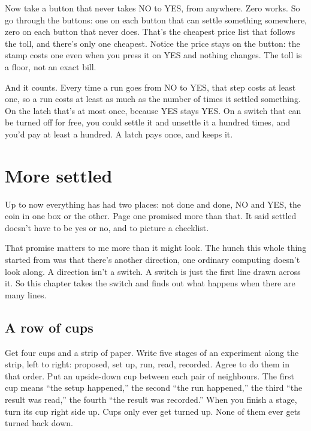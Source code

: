 \documentclass[11pt,twoside]{article}
\theoremstyle{thielethm}
\theoremstyle{thieledef}
\theoremstyle{thieledef}
\theoremstyle{thieledef}
\theoremstyle{thielethm}
\theoremstyle{thieleobs}
\theoremstyle{thielethm}
\begin{document}
Now take a button that never takes NO to YES, from anywhere. Zero works. So go through the buttons: one on each button that can settle something somewhere, zero on each button that never does. That's the cheapest price list that follows the toll, and there's only one cheapest. Notice the price stays on the button: the stamp costs one even when you press it on YES and nothing changes. The toll is a floor, not an exact bill.

And it counts. Every time a run goes from NO to YES, that step costs at least one, so a run costs at least as much as the number of times it settled something. On the latch that's at most once, because YES stays YES. On a switch that can be turned off for free, you could settle it and unsettle it a hundred times, and you'd pay at least a hundred. A latch pays once, and keeps it.

\section{More settled}
\label{sec:more-settled}

Up to now everything has had two places: not done and done, NO and YES, the coin in one box or the other. Page one promised more than that. It said settled doesn't have to be yes or no, and to picture a checklist.

That promise matters to me more than it might look. The hunch this whole thing started from was that there's another direction, one ordinary computing doesn't look along. A direction isn't a switch. A switch is just the first line drawn across it. So this chapter takes the switch and finds out what happens when there are many lines.

\subsection{A row of cups}

Get four cups and a strip of paper. Write five stages of an experiment along the strip, left to right: proposed, set up, run, read, recorded. Agree to do them in that order. Put an upside-down cup between each pair of neighbours. The first cup means ``the setup happened,'' the second ``the run happened,'' the third ``the result was read,'' the fourth ``the result was recorded.'' When you finish a stage, turn its cup right side up. Cups only ever get turned up. None of them ever gets turned back down.
\end{document}
